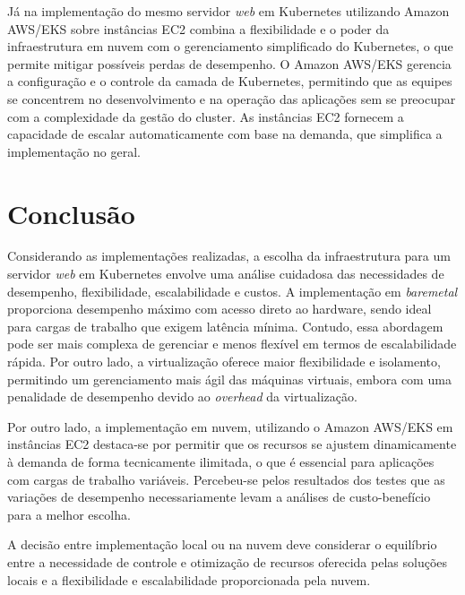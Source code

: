 \documentclass[12pt]{article}
\begin{document}


Já na implementação do mesmo servidor \textit{web} em Kubernetes utilizando Amazon AWS/EKS sobre instâncias EC2 combina a flexibilidade e o poder da infraestrutura em nuvem com o gerenciamento simplificado do Kubernetes, o que permite mitigar possíveis perdas de desempenho. O Amazon AWS/EKS gerencia a configuração e o controle da camada de Kubernetes, permitindo que as equipes se concentrem no desenvolvimento e na operação das aplicações sem se preocupar com a complexidade da gestão do cluster. As instâncias EC2 fornecem a capacidade de escalar automaticamente com base na demanda, que simplifica a implementação no geral.

\section{Conclusão}\label{sec:conclusao}

Considerando as implementações realizadas, a escolha da infraestrutura para um servidor \textit{web} em Kubernetes envolve uma análise cuidadosa das necessidades de desempenho, flexibilidade, escalabilidade e custos. A implementação em \textit{{baremetal}} proporciona desempenho máximo com acesso direto ao hardware, sendo ideal para cargas de trabalho que exigem latência mínima. Contudo, essa abordagem pode ser mais complexa de gerenciar e menos flexível em termos de escalabilidade rápida. Por outro lado, a virtualização oferece maior flexibilidade e isolamento, permitindo um gerenciamento mais ágil das máquinas virtuais, embora com uma penalidade de desempenho devido ao \textit{overhead} da virtualização.

Por outro lado, a implementação em nuvem, utilizando o Amazon AWS/EKS em instâncias EC2 destaca-se por permitir que os recursos se ajustem dinamicamente à demanda de forma tecnicamente ilimitada, o que é essencial para aplicações com cargas de trabalho variáveis. Percebeu-se pelos resultados dos testes que as variações de desempenho necessariamente levam a análises de custo-benefício para a melhor escolha.

A decisão entre implementação local ou na nuvem deve considerar o equilíbrio entre a necessidade de controle e otimização de recursos oferecida pelas soluções locais e a flexibilidade e escalabilidade proporcionada pela nuvem.



\end{document}
